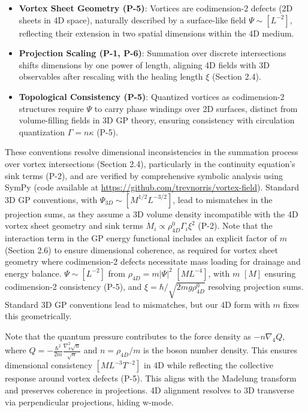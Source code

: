 \begin{itemize}
    \item \textbf{Vortex Sheet Geometry (P-5)}: Vortices are codimension-2 defects (2D sheets in 4D space), naturally described by a surface-like field $\Psi \sim [L^{-2}]$, reflecting their extension in two spatial dimensions within the 4D medium.
    \item \textbf{Projection Scaling (P-1, P-6)}: Summation over discrete intersections shifts dimensions by one power of length, aligning 4D fields with 3D observables after rescaling with the healing length $\xi$ (Section 2.4).
    \item \textbf{Topological Consistency (P-5)}: Quantized vortices as codimension-2 structures require $\Psi$ to carry phase windings over 2D surfaces, distinct from volume-filling fields in 3D GP theory, ensuring consistency with circulation quantization $\Gamma = n \kappa$ (P-5).
\end{itemize}

These conventions resolve dimensional inconsistencies in the summation process over vortex intersections (Section 2.4), particularly in the continuity equation's sink terms (P-2), and are verified by comprehensive symbolic analysis using SymPy (code available at \url{https://github.com/trevnorris/vortex-field}). Standard 3D GP conventions, with $\Psi_{3D} \sim [M^{1/2} L^{-3/2}]$, lead to mismatches in the projection sums, as they assume a 3D volume density incompatible with the 4D vortex sheet geometry and sink terms $\dot{M}_i \propto \rho_{4D}^0 \Gamma_i \xi^2$ (P-2). Note that the interaction term in the GP energy functional includes an explicit factor of $m$ (Section 2.6) to ensure dimensional coherence, as required for vortex sheet geometry where codimension-2 defects necessitate mass loading for drainage and energy balance. $\Psi \sim [L^{-2}]$ from $\rho_{4D} = m |\Psi|^2$ $[M L^{-4}]$, with $m$ $[M]$ ensuring codimension-2 consistency (P-5), and $\xi = \hbar / \sqrt{2 m g \rho_{4D}^0}$ resolving projection sums. Standard 3D GP conventions lead to mismatches, but our 4D form with $m$ fixes this geometrically.

Note that the quantum pressure contributes to the force density as $-n \nabla_4 Q$, where $Q = -\frac{\hbar^2}{2m} \frac{\nabla_4^2 \sqrt{n}}{\sqrt{n}}$ and $n = \rho_{4D}/m$ is the boson number density. This ensures dimensional consistency $[M L^{-3} T^{-2}]$ in 4D while reflecting the collective response around vortex defects (P-5). This aligns with the Madelung transform and preserves coherence in projections. 4D alignment resolves to 3D transverse via perpendicular projections, hiding w-mode.

